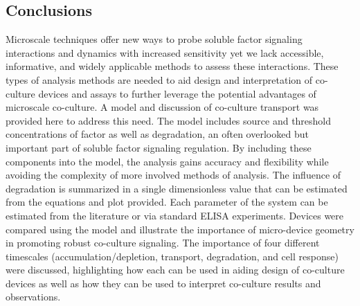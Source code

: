 \subsection{Conclusions}
Microscale techniques offer new ways to probe soluble factor signaling interactions and dynamics with increased sensitivity yet we lack accessible, informative, and widely applicable methods to assess these interactions. These types of analysis methods are needed to aid design and interpretation of co-culture devices and assays to further leverage the potential advantages of microscale co-culture. A model and discussion of co-culture transport was provided here to address this need. The model includes source and threshold concentrations of factor as well as degradation, an often overlooked but important part of soluble factor signaling regulation. By including these components into the model, the analysis gains accuracy and flexibility while avoiding the complexity of more involved methods of analysis. The influence of degradation is summarized in a single dimensionless value that can be estimated from the equations and plot provided. Each parameter of the system can be estimated from the literature or via standard ELISA experiments. Devices were compared using the model and illustrate the importance of micro-device geometry in promoting robust co-culture signaling. The importance of four different timescales (accumulation\slash depletion, transport, degradation, and cell response) were discussed, highlighting how each can be used in aiding design of co-culture devices as well as how they can be used to interpret co-culture results and observations.  

